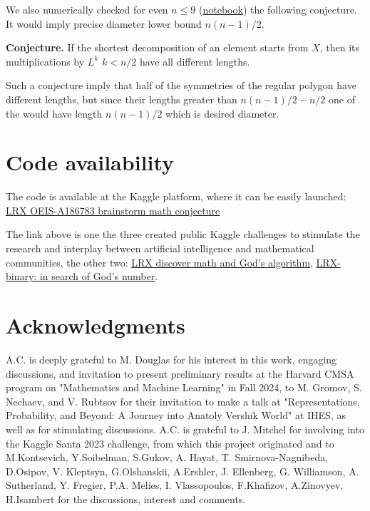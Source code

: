 \documentclass[atmp]{ipart_v1}
\numberwithin{equation}{section}
\theoremstyle{plain}%
\begin{document}
We also numerically checked for even  $n \le 9$ (\href{https://www.kaggle.com/code/fedmug/lrx-shifts-starting-with-x}{notebook}) the following conjecture. It   would imply precise diameter lower bound $n(n-1)/2$. 

{\bf Conjecture.} If the shortest  decomposition of an element starts from $X$, then its multiplications by $L^k$ $k<n/2$  have all different lengths.  

Such a conjecture imply that half of the symmetries of the regular polygon have different lengths, but since their lengths greater than $n(n-1)/2-n/2$ one of the would have length $n(n-1)/2$ which is desired diameter. 

\section{Code availability}

The code is available at the Kaggle platform, where it can be easily launched:
\href{https://www.kaggle.com/competitions/lrx-oeis-a-186783-brainstorm-math-conjecture/code}{LRX OEIS-A186783 brainstorm math conjecture}

The link above is one  the three  created public Kaggle challenges to stimulate the research and interplay between artificial intelligence and mathematical communities, the other two:
\href{https://www.kaggle.com/competitions/lrx-binary-in-search-of-gods-number}{LRX discover math and God's algorithm}, \href{https://www.kaggle.com/competitions/lrx-discover-math-gods-algorithm}{LRX-binary: in search of God's number}.


\section{Acknowledgments}
A.C. is deeply grateful to M. Douglas for his interest in this work, engaging discussions, and invitation to present preliminary results at the Harvard CMSA program on "Mathematics and Machine Learning" in Fall 2024, to M. Gromov, S. Nechaev, and V. Rubtsov for their invitation to make a talk at "Representations, Probability, and Beyond: A Journey into Anatoly Vershik World" at IHES, as well as for stimulating discussions. A.C. is grateful to J. Mitchel for involving  into the Kaggle Santa 2023 challenge, from which this project originated and to M.Kontsevich, Y.Soibelman,  S.Gukov, A. Hayat, T. Smirnova-Nagnibeda,  D.Osipov, V. Kleptsyn, G.Olshanskii, A.Ershler, J. Ellenberg, G. Williamson, A. Sutherland,  Y. Fregier, P.A. Melies, I. Vlassopoulos, F.Khafizov, A.Zinovyev,  H.Isambert for the discussions, interest and comments. 
\end{document}
